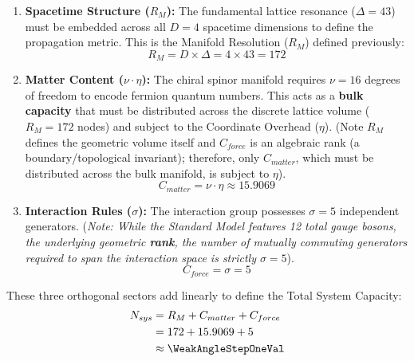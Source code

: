 \begin{enumerate}
    \item \textbf{Spacetime Structure ($R_M$):} The fundamental lattice resonance ($\Delta=43$) must be embedded across all $D=4$ spacetime dimensions to define the propagation metric. This is the Manifold Resolution ($R_M$) defined previously:
    \begin{equation}
        R_M = D \times \Delta = 4 \times 43 = 172
    \end{equation}
    
    \item \textbf{Matter Content ($\nu \cdot \eta$):} The chiral spinor manifold requires $\nu=16$ degrees of freedom to encode fermion quantum numbers. This acts as a \textbf{bulk capacity} that must be distributed across the discrete lattice volume ($R_M = 172$ nodes) and subject to the Coordinate Overhead ($\eta$). (Note $R_M$ defines the geometric volume itself and $C_{force}$ is an algebraic rank (a boundary/topological invariant); therefore, only $C_{matter}$, which must be distributed across the bulk manifold, is subject to $\eta$). 
    \begin{equation}
        C_{matter} = \nu \cdot \eta \approx 15.9069
    \end{equation}
    
    \item \textbf{Interaction Rules ($\sigma$):} The interaction group possesses $\sigma=5$ independent generators. (\textit{Note: While the Standard Model features 12 total gauge bosons, the underlying geometric \textbf{rank}, the number of mutually commuting generators required to span the interaction space is strictly $\sigma=5$}).
    \begin{equation}
        C_{force} = \sigma = 5
    \end{equation}
\end{enumerate}


These three orthogonal sectors add linearly to define the Total System Capacity:
\begin{equation}
\label{eq:system_capacity}
\begin{split}
N_{sys} &= R_M + C_{matter} + C_{force} \\
&= 172 + 15.9069 + 5 \\
&\approx \mathbf{\WeakAngleStepOneVal}
\end{split}
\end{equation}

